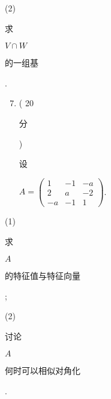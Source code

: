 \documentclass[10pt]{article}
\begin{document}
(2) \begin{CJK}{UTF8}{mj}求\end{CJK} $V \cap W$ \begin{CJK}{UTF8}{mj}的一组基\end{CJK}.

\begin{enumerate}
  \setcounter{enumi}{6}
  \item ( 20 \begin{CJK}{UTF8}{mj}分\end{CJK}) \begin{CJK}{UTF8}{mj}设\end{CJK} $A=\left(\begin{array}{ccc}1 & -1 & -a \\ 2 & a & -2 \\ -a & -1 & 1\end{array}\right)$.
\end{enumerate}
(1) \begin{CJK}{UTF8}{mj}求\end{CJK} $A$ \begin{CJK}{UTF8}{mj}的特征值与特征向量\end{CJK};

(2) \begin{CJK}{UTF8}{mj}讨论\end{CJK} $A$ \begin{CJK}{UTF8}{mj}何时可以相似对角化\end{CJK}.
\end{document}
